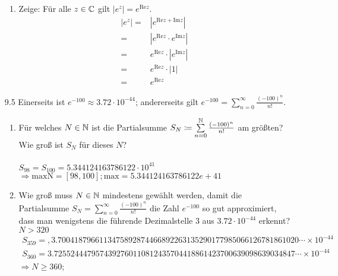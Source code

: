 \documentclass{HM}
\begin{document}
\begin{enumerate}
\begin{enumerate}
	\item Zeige: Für alle $z\in\mathbb{C}$ gilt $|e^z|=e^{\text{Re} z}$.
	\begin{align*}
		|e^z|
		=&|e^{\text{Re} z +\text{Im} z}|\\
		=&|e^{\text{Re} z}\cdot e^{\text{Im} z}|\\
		=&e^{\text{Re} z}\cdot |e^{\text{Im} z}|\\
		=&e^{\text{Re} z}\cdot |1|\\
		=&e^{\text{Re} z}
	\end{align*}
\end{enumerate}
\item[9.5] Einerseits ist $e^{-100}\approx 3.72\cdot 10^{-44}$; andererseits gilt $e^{-100}=\sum\limits_{n=0}^\infty\frac{(-100)^n}{n!}$.
\begin{enumerate}
	\item Für welches $N\in\mathbb{N}$ ist die Partialsumme $S_N\coloneqq\sum\limits_{n=0}^{\mathbb{N}}\frac{(-100)^n}{n!}$ am größten? Wie groß ist $S_N$ für dieses $N$?\\\\
	 $S_{98}=S_{100}=5.344124163786122\cdot 10^{41}$\\
	
	$\Rightarrow\text{maxN} = [98, 100]; \text{max} = 5.344124163786122e+41$
	
	\item Wie groß muss $N\in\mathbb{N}$ mindestens gewählt werden, damit die Partialsumme $S_N=\sum\limits_{n=0}^\infty\frac{(-100)^n}{n!}$ die Zahl $e^{-100}$ so gut approximiert, dass man wenigstens die führende Dezimalstelle $3$ aus $3.72\cdot 10^{-44}$ erkennt?\\
$N>320$
\begin{align*}
	S_{359}=,3.7004187966113475892874466892263135290177985066126781861020\cdots\times 10^{-44}\\
	S_{360}=3.7255244479574392760110812435704418861423700639098639034847\cdots \times 10^{-44}
\end{align*}
$\Rightarrow N\geq360$;
\end{enumerate}


\end{enumerate}
\end{document}

